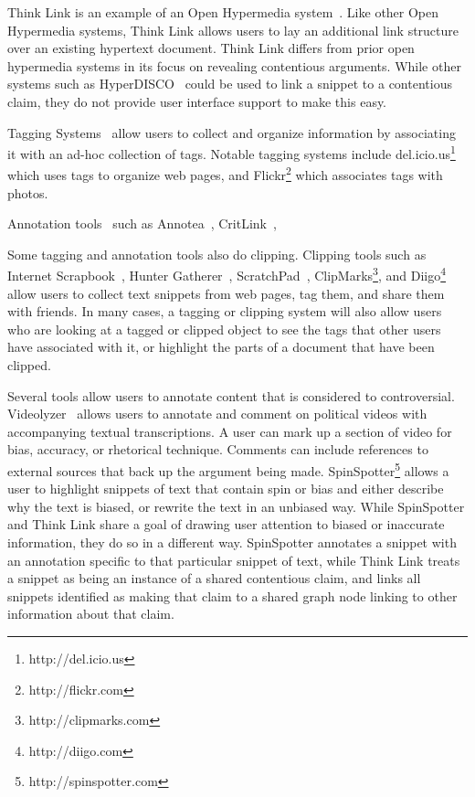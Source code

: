 \documentclass{chi2009}
\newcommand{\todo}[1]{}
\begin{document}
Think Link is an example of an Open Hypermedia system~\cite{Bouvin2000}. Like other Open Hypermedia systems, Think Link allows users to lay an additional link structure over an existing hypertext document. Think Link differs from prior open hypermedia systems in its focus on revealing contentious arguments. While other systems such as HyperDISCO~\cite{Wiil1996} could be used to link a snippet to a contentious claim, they do not provide user interface support to make this easy.

\todo{Say how different from other Open Hypermedia link annotation systems}

Tagging Systems~\cite{Marlow2006,Golder2006} allow users to collect and organize information by associating it with an ad-hoc collection of tags. Notable tagging systems include del.icio.us\footnote{http://del.icio.us} which uses tags to organize web pages, and Flickr\footnote{http://flickr.com} which associates tags with photos. 

Annotation tools~\cite{Marshall1998} such as Annotea~\cite{Koivunen2001}, CritLink~\cite{Yee2002}, 

Some tagging and annotation tools also do clipping. Clipping tools such as Internet Scrapbook~\cite{Sugiura1998}, Hunter Gatherer~\cite{Schraefel2002}, ScratchPad~\cite{Gotz2007}, ClipMarks\footnote{http://clipmarks.com}, and Diigo\footnote{http://diigo.com} allow users to collect text snippets from web pages, tag them, and share them with friends. In many cases, a tagging or clipping system will also allow users who are looking at a tagged or clipped object to see the tags that other users have associated with it, or highlight the parts of a document that have been clipped.

Several tools allow users to annotate content that is considered to controversial. Videolyzer~\cite{Diakopoulos2008} allows users to annotate and comment on political videos with accompanying textual transcriptions. A user can mark up a section of video for bias, accuracy, or rhetorical technique. Comments can include references to external sources that back up the argument being made. SpinSpotter\footnote{http://spinspotter.com} allows a user to highlight snippets of text that contain spin or bias and either describe why the text is biased, or rewrite the text in an unbiased way. While SpinSpotter and Think Link share a goal of drawing user attention to biased or inaccurate information, they do so in a different way. SpinSpotter annotates a snippet with an annotation specific to that particular snippet of text, while Think Link treats a snippet as being an instance of a shared contentious claim, and links all snippets identified as making that claim to a shared graph node linking to other information about that claim.
\end{document}
